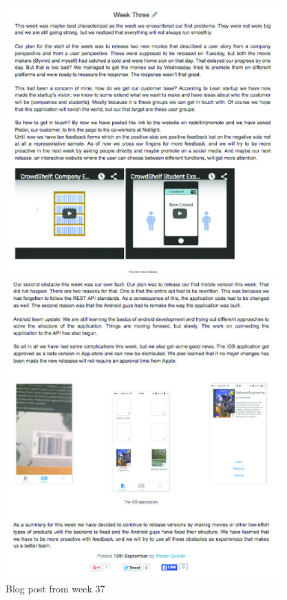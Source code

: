 \begin{figure}
\centering
\includegraphics[height=22cm]{figs/v01/WeekThree.jpg}
\caption{Blog post from week 37}
\label{fig:week-three}
\end{figure}

